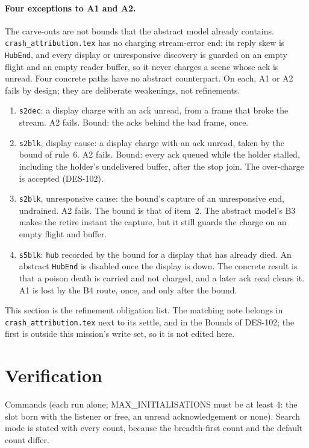 \documentclass[a4paper,10pt,fleqn]{article}
\begin{document}
\paragraph{Four exceptions to A1 and A2.}
The carve-outs are not bounds that the abstract model already contains.
\texttt{crash\_attribution.tex} has no charging stream-error end: its reply skew
is \texttt{HubEnd}, and every display or unresponsive discovery is guarded on an
empty flight and an empty reader buffer, so it never charges a scene whose ack
is unread.  Four concrete paths have no abstract counterpart.  On each, A1 or A2
fails by design; they are deliberate weakenings, not refinements.
\begin{enumerate}
  \item \texttt{s2dec}: a display charge with an ack unread, from a frame that
    broke the stream.  A2 fails.  Bound: the acks behind the bad frame, once.
  \item \texttt{s2blk}, display cause: a display charge with an ack unread,
    taken by the bound of rule~6.  A2 fails.  Bound: every ack queued while the
    holder stalled, including the holder's undelivered buffer, after the stop
    join.  The over-charge is accepted (DES-102).
  \item \texttt{s2blk}, unresponsive cause: the bound's capture of an
    unresponsive end, undrained.  A2 fails.  The bound is that of item~2.  The
    abstract model's B3 makes the retire instant the capture, but it still
    guards the charge on an empty flight and buffer.
  \item \texttt{s5blk}: \texttt{hub} recorded by the bound for a display that has
    already died.  An abstract \texttt{HubEnd} is disabled once the display is
    down.  The concrete result is that a poison death is carried and not charged,
    and a later ack read clears it.  A1 is lost by the B4 route, once, and only
    after the bound.
\end{enumerate}

This section is the refinement obligation list.  The matching note belongs in
\texttt{crash\_attribution.tex} next to its settle, and in the Bounds of DES-102;
the first is outside this mission's write set, so it is not edited here.

\section{Verification}

Commands (each run alone; MAX\_INITIALISATIONS must be at least 4: the slot
born with the listener or free, an unread acknowledgement or none).  Search mode
is stated with every count, because the breadth-first count and the default
count differ.
\end{document}
